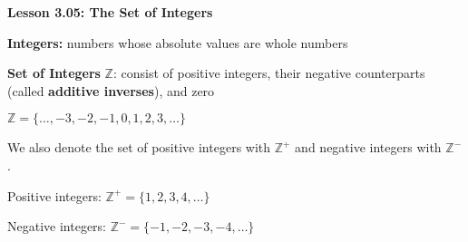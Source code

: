 \begin{center}
\textbf{Lesson 3.05: The Set of Integers}
\end{center}

\vspace*{-1.5ex}

\noindent\textbf{Integers:} numbers whose absolute values are whole numbers

\noindent\textbf{Set of Integers} \(\mathbb{Z}\): consist of positive integers, their negative counterparts (called \textbf{additive inverses}), and zero

{\centering $ \mathbb{Z} = \{\ldots, -3, -2, -1, 0, 1, 2, 3, \ldots\} $\par}

\noindent We also denote the set of positive integers with \(\mathbb{Z}^{+}\) and negative integers with \(\mathbb{Z}^{-}\).

\noindent Positive integers: \(\mathbb{Z}^{+} = \{1,2,3,4,\ldots\}\)

\noindent Negative integers: \(\mathbb{Z}^{-} = \{-1,-2,-3,-4,\ldots\}\)

